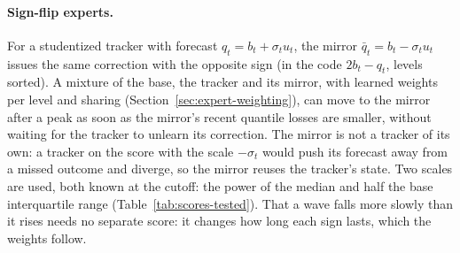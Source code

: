 \documentclass[11pt,a4paper]{article}
\theoremstyle{definition}
\theoremstyle{remark}
\begin{document}
\paragraph{Sign-flip experts.} For a studentized tracker with forecast
$q_t=b_t+\sigma_tu_t$, the mirror $\bar q_t=b_t-\sigma_tu_t$ issues the same
correction with the opposite sign (in the code $2b_t-q_t$, levels sorted).
A mixture of the base, the tracker and its mirror, with learned weights per
level and sharing (Section~\ref{sec:expert-weighting}), can move to the
mirror after a peak as soon as the mirror's recent quantile losses are
smaller, without waiting for the tracker to unlearn its correction. The
mirror is not a tracker of its own: a tracker on the score with the scale
$-\sigma_t$ would push its forecast away from a missed outcome and diverge,
so the mirror reuses the tracker's state. Two scales are used, both known
at the cutoff: the power of the median and half the base interquartile
range (Table~\ref{tab:scores-tested}).
That a wave falls more slowly than it rises needs no separate score: it
changes how long each sign lasts, which the weights follow.
\end{document}
